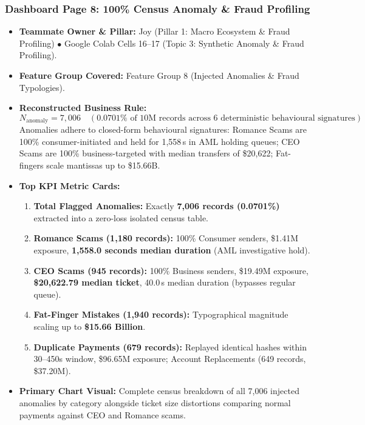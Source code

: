 \documentclass[11pt,a4paper]{article}
\begin{document}
\subsubsection{Dashboard Page 8: 100\% Census Anomaly \& Fraud Profiling}
\begin{itemize}
    \item \textbf{Teammate Owner \& Pillar:} Joy (Pillar 1: Macro Ecosystem \& Fraud Profiling) $\bullet$ Google Colab Cells 16--17 (Topic 3: Synthetic Anomaly \& Fraud Profiling).
    \item \textbf{Feature Group Covered:} Feature Group 8 (Injected Anomalies \& Fraud Typologies).
    \item \textbf{Reconstructed Business Rule:}
    \begin{equation}
    N_{\text{anomaly}} = 7,006 \quad (0.0701\% \text{ of 10M records across 6 deterministic behavioural signatures})
    \end{equation}
    Anomalies adhere to closed-form behavioural signatures: Romance Scams are 100\% consumer-initiated and held for 1,558\,s in AML holding queues; CEO Scams are 100\% business-targeted with median transfers of \$20,622; Fat-fingers scale mantissas up to \$15.66B.
    \item \textbf{Top KPI Metric Cards:}
    \begin{enumerate}
        \item \textbf{Total Flagged Anomalies:} Exactly \textbf{7,006 records (0.0701\%)} extracted into a zero-loss isolated census table.
        \item \textbf{Romance Scams (1,180 records):} 100\% Consumer senders, \$1.41M exposure, \textbf{1,558.0 seconds median duration} (AML investigative hold).
        \item \textbf{CEO Scams (945 records):} 100\% Business senders, \$19.49M exposure, \textbf{\$20,622.79 median ticket}, 40.0\,s median duration (bypasses regular queue).
        \item \textbf{Fat-Finger Mistakes (1,940 records):} Typographical magnitude scaling up to \textbf{\$15.66 Billion}.
        \item \textbf{Duplicate Payments (679 records):} Replayed identical hashes within 30--450s window, \$96.65M exposure; Account Replacements (649 records, \$37.20M).
    \end{enumerate}
    \item \textbf{Primary Chart Visual:} Complete census breakdown of all 7,006 injected anomalies by category alongside ticket size distortions comparing normal payments against CEO and Romance scams.

\end{itemize}
\end{document}
